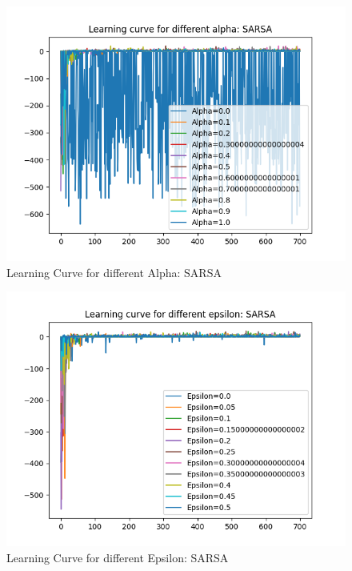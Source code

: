 \documentclass[conf]{new-aiaa}
\begin{document}
\begin{figure}[H]
\centering
\includegraphics[width=30pc]{figs/pen/alpha_sweep_SARSA.png}
\caption{Learning Curve for different Alpha: SARSA}
\label{fig_env1}
\end{figure}


\begin{figure}[H]
\centering
\includegraphics[width=30pc]{figs/pen/epsilon_sweep_SARSA.png}
\caption{Learning Curve for different Epsilon: SARSA}
\label{fig_env1}
\end{figure}
\end{document}
